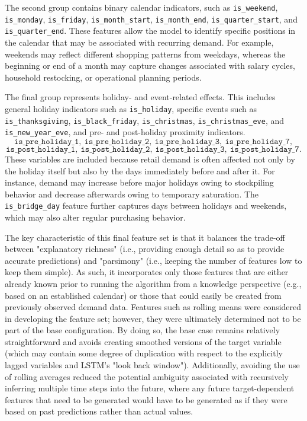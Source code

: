 The second group contains binary calendar indicators, such as \texttt{is\_weekend}, \texttt{is\_monday}, \texttt{is\_friday}, \texttt{is\_month\_start}, \texttt{is\_month\_end}, \texttt{is\_quarter\_start}, and \texttt{is\_quarter\_end}. These features allow the model to identify specific positions in the calendar that may be associated with recurring demand. For example, weekends may reflect different shopping patterns from weekdays, whereas the beginning or end of a month may capture changes associated with salary cycles, household restocking, or operational planning periods.

The final group represents holiday- and event-related effects. This includes general holiday indicators such as \texttt{is\_holiday}, specific events such as \texttt{is\_thanksgiving}, \texttt{is\_black\_friday}, \texttt{is\_christmas}, \texttt{is\_christmas\_eve}, and \texttt{is\_new\_year\_eve}, and pre- and post-holiday proximity indicators.
\[
\texttt{is\_pre\_holiday\_1},\ 
\texttt{is\_pre\_holiday\_2},\ 
\texttt{is\_pre\_holiday\_3},\ 
\texttt{is\_pre\_holiday\_7},
\]
\[
\texttt{is\_post\_holiday\_1},\ 
\texttt{is\_post\_holiday\_2},\ 
\texttt{is\_post\_holiday\_3},\ 
\texttt{is\_post\_holiday\_7}.
\]
These variables are included because retail demand is often affected not only by the holiday itself but also by the days immediately before and after it. For instance, demand may increase before major holidays owing to stockpiling behavior and decrease afterwards owing to temporary saturation. The \texttt{is\_bridge\_day} feature further captures days between holidays and weekends, which may also alter regular purchasing behavior.

The key characteristic of this final feature set is that it balances the trade-off between "explanatory richness" (i.e., providing enough detail so as to provide accurate predictions) and "parsimony" (i.e., keeping the number of features low to keep them simple). As such, it incorporates only those features that are either already known prior to running the algorithm from a knowledge perspective (e.g., based on an established calendar) or those that could easily be created from previously observed demand data. Features such as rolling means were considered in developing the feature set; however, they were ultimately determined not to be part of the base configuration. By doing so, the base case remains relatively straightforward and avoids creating smoothed versions of the target variable (which may contain some degree of duplication with respect to the explicitly lagged variables and LSTM's "look back window"). Additionally, avoiding the use of rolling averages reduced the potential ambiguity associated with recursively inferring multiple time steps into the future, where any future target-dependent features that need to be generated would have to be generated as if they were based on past predictions rather than actual values.

